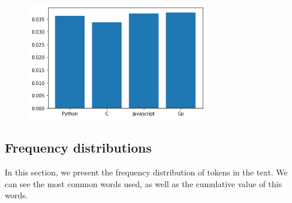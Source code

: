 \documentclass[]{article}
\begin{document}
\begin{enumerate}
                    \begin{figure}[H]
    \includegraphics[width=8cm]{resources/long_words.png}
    \centering
    \end{figure}
    
\end{enumerate}

\subsection{Frequency distributions}
In this section, we present the frequency distribution of tokens in the text. We can see the most common words used, as well as the cumulative value of this words. 
\end{document}

